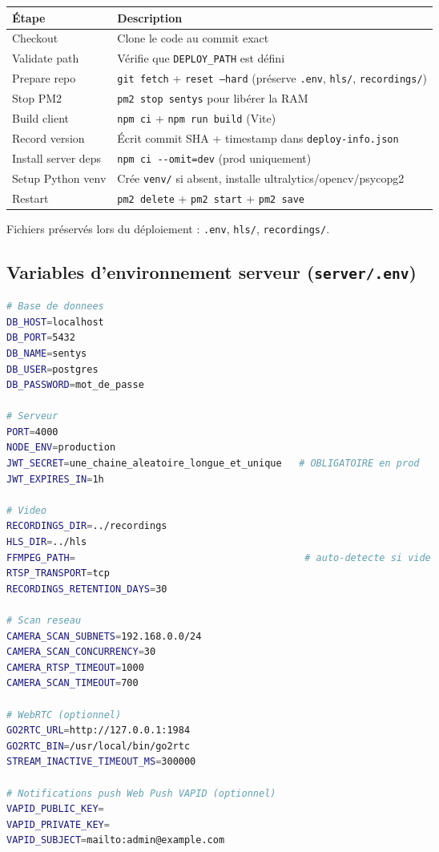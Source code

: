 \documentclass[12pt,a4paper]{article}
\begin{document}
\begin{longtable}{|l|p{9cm}|}
\hline
\textbf{Étape} & \textbf{Description} \\
\hline
\endhead
\hline
\endfoot
Checkout & Clone le code au commit exact \\
Validate path & Vérifie que \texttt{DEPLOY\_PATH} est défini \\
Prepare repo & \texttt{git fetch} + \texttt{reset --hard} (préserve \texttt{.env}, \texttt{hls/}, \texttt{recordings/}) \\
Stop PM2 & \texttt{pm2 stop sentys} pour libérer la RAM \\
Build client & \texttt{npm ci} + \texttt{npm run build} (Vite) \\
Record version & Écrit commit SHA + timestamp dans \texttt{deploy-info.json} \\
Install server deps & \texttt{npm ci -{}-omit=dev} (prod uniquement) \\
Setup Python venv & Crée \texttt{venv/} si absent, installe ultralytics/opencv/psycopg2 \\
Restart & \texttt{pm2 delete} + \texttt{pm2 start} + \texttt{pm2 save} \\
\hline
\end{longtable}

Fichiers préservés lors du déploiement : \texttt{.env}, \texttt{hls/}, \texttt{recordings/}.

\subsection{Variables d'environnement serveur (\texttt{server/.env})}

\begin{lstlisting}[language=bash]
# Base de donnees
DB_HOST=localhost
DB_PORT=5432
DB_NAME=sentys
DB_USER=postgres
DB_PASSWORD=mot_de_passe

# Serveur
PORT=4000
NODE_ENV=production
JWT_SECRET=une_chaine_aleatoire_longue_et_unique   # OBLIGATOIRE en prod
JWT_EXPIRES_IN=1h

# Video
RECORDINGS_DIR=../recordings
HLS_DIR=../hls
FFMPEG_PATH=                                        # auto-detecte si vide
RTSP_TRANSPORT=tcp
RECORDINGS_RETENTION_DAYS=30

# Scan reseau
CAMERA_SCAN_SUBNETS=192.168.0.0/24
CAMERA_SCAN_CONCURRENCY=30
CAMERA_RTSP_TIMEOUT=1000
CAMERA_SCAN_TIMEOUT=700

# WebRTC (optionnel)
GO2RTC_URL=http://127.0.0.1:1984
GO2RTC_BIN=/usr/local/bin/go2rtc
STREAM_INACTIVE_TIMEOUT_MS=300000

# Notifications push Web Push VAPID (optionnel)
VAPID_PUBLIC_KEY=
VAPID_PRIVATE_KEY=
VAPID_SUBJECT=mailto:admin@example.com
\end{lstlisting}
\end{document}
